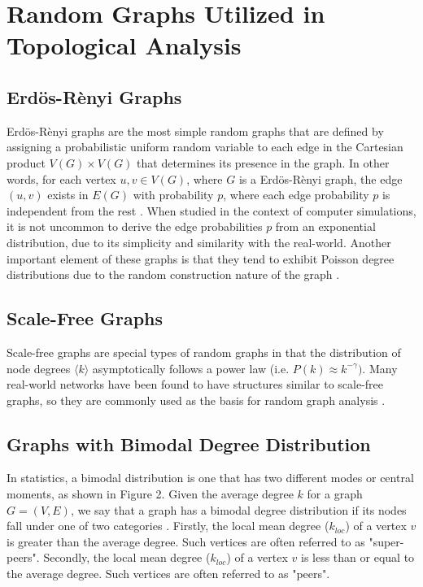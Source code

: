 \documentclass[doc]{apa}%
\begin{document}
\section{Random Graphs Utilized in Topological Analysis}

\subsection{Erd\"{o}s-R\`{e}nyi Graphs}
Erd\"{o}s-R\`{e}nyi graphs are the most simple random graphs that are defined by assigning a probabilistic uniform random variable to each edge in the Cartesian product $V(G) \times V(G)$ that determines its presence in the graph. In other words, for each vertex $u, v \in V(G)$, where $G$ is a Erd\"{o}s-R\`{e}nyi graph, the edge $(u,v)$ exists in $E(G)$ with probability $p$, where each edge probability $p$ is independent from the rest \cite{LargeNetworkRobustnessPVM}. When studied in the context of computer simulations, it is not uncommon to derive the edge probabilities $p$ from an exponential distribution, due to its simplicity and similarity with the real-world. Another important element of these graphs is that they tend to exhibit Poisson degree distributions due to the random construction nature of the graph \cite{bimodal}.


\subsection{Scale-Free Graphs}
Scale-free graphs are special types of random graphs in that the distribution of node degrees $\langle k \rangle$ asymptotically follows a power law (i.e. $P(k) \approx k^{-\gamma})$. Many real-world networks have been found to have structures similar to scale-free graphs, so they are commonly used as the basis for random graph analysis \cite{AttacksWavesRandom}. 


\subsection{Graphs with Bimodal Degree Distribution}

In statistics, a bimodal distribution is one that has two different modes or central moments, as shown in Figure 2. Given the average degree $k$ for a graph $G = (V,E)$, we say that a graph has a bimodal degree distribution if its nodes fall under one of two categories \cite{bimodal}. Firstly, the local mean degree ($k_{loc}$) of a vertex $v$ is greater than the average degree. Such vertices are often referred to as "super-peers". Secondly, the local mean degree ($k_{loc}$) of a vertex $v$ is less than or equal to the average degree. Such vertices are often referred to as "peers".
\end{document}

